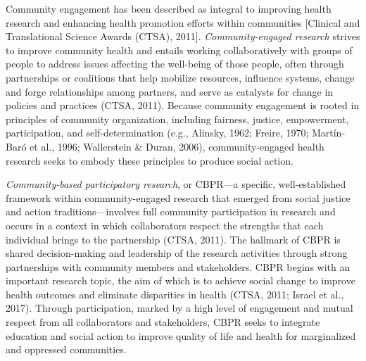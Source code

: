 \documentclass[
  11pt,
]{book}
\begin{document}
Community engagement has been described as integral to improving health research and enhancing health promotion efforts within communities {[}Clinical and Translational Science Awards (CTSA), 2011{]}. \emph{Community-engaged research} strives to improve community health and entails working collaboratively with groups of people to address issues affecting the well-being of those people, often through partnerships or coalitions that help mobilize resources, influence systems, change and forge relationships among partners, and serve as catalysts for change in policies and practices (CTSA, 2011). Because community engagement is rooted in principles of community organization, including fairness, justice, empowerment, participation, and self-determination (e.g., Alinsky, 1962; Freire, 1970; Martín-Baró et al., 1996; Wallerstein \& Duran, 2006), community-engaged health research seeks to embody these principles to produce social action.

\emph{Community-based participatory research}, or CBPR---a specific, well-established framework within community-engaged research that emerged from social justice and action traditions---involves full community participation in research and occurs in a context in which collaborators respect the strengths that each individual brings to the partnership (CTSA, 2011). The hallmark of CBPR is shared decision-making and leadership of the research activities through strong partnerships with community members and stakeholders. CBPR begins with an important research topic, the aim of which is to achieve social change to improve health outcomes and eliminate disparities in health (CTSA, 2011; Israel et al., 2017). Through participation, marked by a high level of engagement and mutual respect from all collaborators and stakeholders, CBPR seeks to integrate education and social action to improve quality of life and health for marginalized and oppressed communities.
\end{document}
